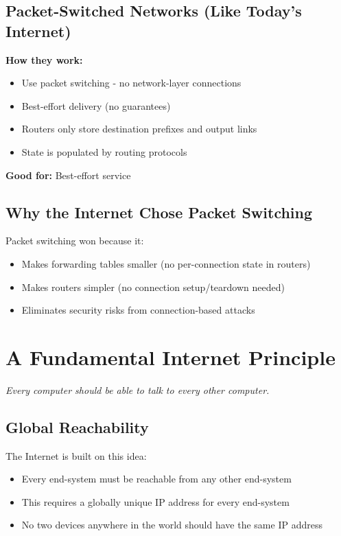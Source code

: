 \documentclass[../../compsys.tex]{subfiles}
\begin{document}
\subsection{Packet-Switched Networks (Like Today's Internet)}
\textbf{How they work:}
\begin{itemize}
    \item Use packet switching - no network-layer connections
    \item Best-effort delivery (no guarantees)
    \item Routers only store destination prefixes and output links
    \item State is populated by routing protocols
\end{itemize}

\textbf{Good for:} Best-effort service

\subsection{Why the Internet Chose Packet Switching}
Packet switching won because it:
\begin{itemize}
    \item Makes forwarding tables smaller (no per-connection state in routers)
    \item Makes routers simpler (no connection setup/teardown needed)
    \item Eliminates security risks from connection-based attacks
\end{itemize}
\newpage

\section{A Fundamental Internet Principle}
\textit{Every computer should be able to talk to every other computer.}

\subsection{Global Reachability}
The Internet is built on this idea:
\begin{itemize}
    \item Every end-system must be reachable from any other end-system
    \item This requires a globally unique IP address for every end-system
    \item No two devices anywhere in the world should have the same IP address
\end{itemize}
\end{document}

